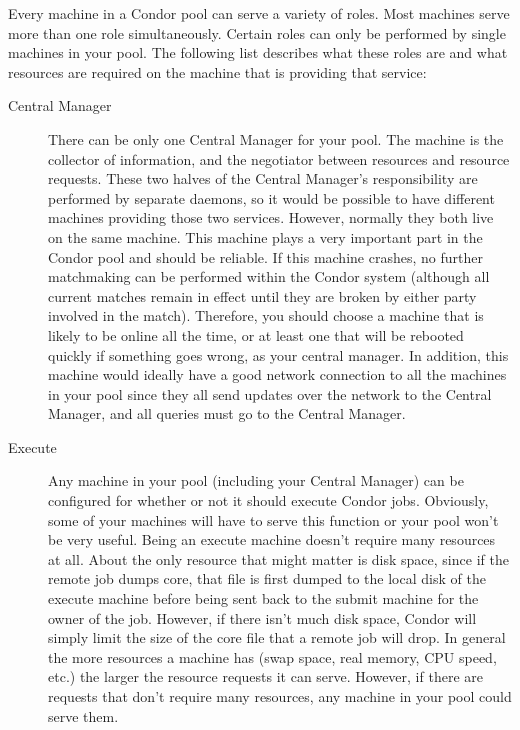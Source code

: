 Every machine in a Condor pool can serve a variety of roles.  Most
machines serve more than one role simultaneously.  Certain roles can
only be performed by single machines in your pool.  The following list
describes what these roles are and what resources are required on the
machine that is providing that service:

\begin{description} 

\item[Central Manager] There can be only one Central Manager for your
pool.  The machine is the collector of information, and the negotiator
between resources and resource requests.  These two halves of the
Central Manager's responsibility are performed by separate daemons, so
it would be possible to have different machines providing those two
services.  However, normally they both live on the same machine.  This
machine plays a very important part in the Condor pool and should be
reliable.  If this machine crashes, no further matchmaking can be
performed within the Condor system (although all current matches
remain in effect until they are broken by either party involved in the
match).  Therefore, you should choose a machine that is likely to be
online all the time, or at least one that will be rebooted quickly if
something goes wrong, as your central manager.  In addition, this
machine would ideally have a good network connection to all the
machines in your pool since they all send updates over the network to
the Central Manager, and all queries must go to the Central Manager. 

\item[Execute] Any machine in your pool (including your Central
Manager) can be configured for whether or not it should execute Condor
jobs.  Obviously, some of your machines will have to serve this
function or your pool won't be very useful.  Being an execute machine
doesn't require many resources at all.  About the only resource that
might matter is disk space, since if the remote job dumps core, that
file is first dumped to the local disk of the execute machine before
being sent back to the submit machine for the owner of the job.
However, if there isn't much disk space, Condor will simply limit the
size of the core file that a remote job will drop.  In general the
more resources a machine has (swap space, real memory, CPU speed,
etc.) the larger the resource requests it can serve.  However, if
there are requests that don't require many resources, any machine
in your pool could serve them.


\end{description}
